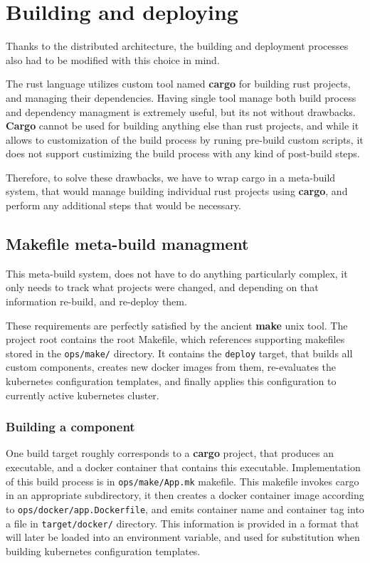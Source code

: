 \section{Building and deploying}
Thanks to the distributed architecture, the building and deployment processes also had to be modified with this choice in mind.

The rust language utilizes custom tool named \textbf{cargo} for building rust projects, and managing their dependencies.
Having single tool manage both build process and dependency managment is extremely useful, but its not without drawbacks.
\textbf{Cargo} cannot be used for building anything else than rust projects, and while it allows to customization
of the build process by runing pre-build custom scripts, it does not support custimizing the build process with
any kind of post-build steps.

Therefore, to solve these drawbacks, we have to wrap cargo in a meta-build system, that would manage building
individual rust projects using \textbf{cargo}, and perform any additional steps that would be necessary.

\subsection{Makefile meta-build managment}
This meta-build system, does not have to do anything particularly complex, it only needs to track what projects
were changed, and depending on that information re-build, and re-deploy them.

These requirements are perfectly satisfied by the ancient \textbf{make} unix tool.
The project root contains the root Makefile, which references supporting makefiles stored in the \verb|ops/make/| directory.
It contains the \verb|deploy| target, that builds all custom components, creates new docker images from them,
re-evaluates the kubernetes configuration templates, and finally applies this configuration to currently active kubernetes cluster.


\subsubsection{Building a component}
One build target roughly corresponds to a \textbf{cargo} project, that produces an executable, and a docker container
that contains this executable. Implementation of this build process is in \verb|ops/make/App.mk| makefile. This makefile
invokes cargo in an appropriate subdirectory, it then creates a docker container image according to \verb|ops/docker/app.Dockerfile|,
and emits container name and container tag into a file in \verb|target/docker/| directory. This information is provided in a format
that will later be loaded into an environment variable, and used for substitution when building kubernetes
configuration templates.

